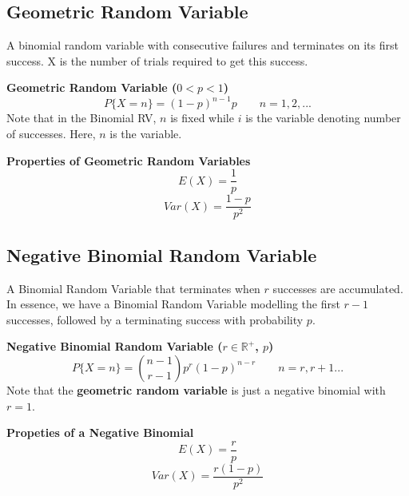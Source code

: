 \documentclass[10pt,a4paper]{article}
\begin{document}
               	\subsection{Geometric Random Variable}
               	A binomial random variable with consecutive failures and terminates on its first success. X is the number of trials required to get this success.
               	\begin{framed}
               		\centering\textbf{Geometric Random Variable ($ 0 < p < 1$)}
               		$$P\{X=n\} = (1-p)^{n-1}p \qquad n=1,2,...$$
               		Note that in the Binomial RV, $n$ is fixed while $i$ is the variable denoting number of successes. Here, $n$ is the variable.
               	\end{framed}
               	\begin{framed}
               		\centering\textbf{Properties of Geometric Random Variables}
               		$$E(X) = \frac{1}{p}$$
               		$$Var(X) = \frac{1-p}{p^{2}}$$
               	\end{framed}
               	\newpage 
               	\subsection{Negative Binomial Random Variable}
               	A Binomial Random Variable that terminates when $r$ successes are accumulated. In essence, we have a Binomial Random Variable modelling the first $r-1$ successes, followed by a terminating success with probability $p$.
               	\begin{framed}
               		\centering\textbf{Negative Binomial Random Variable ($r \in \mathbb{R}^{+}$, $p$)}
               		$$P\{X=n\} = \binom{n-1}{r-1}p^{r}(1-p)^{n-r} \qquad n=r,r+1...$$
               		Note that the \textbf{geometric random variable} is just a negative binomial with $r=1$.
               	\end{framed}
               	\begin{framed}
               		\centering\textbf{Propeties of a Negative Binomial}
               		$$E(X) = \frac{r}{p}$$
               		$$Var(X) = \frac{r(1-p)}{p^{2}}$$
               	\end{framed}
\end{document}
